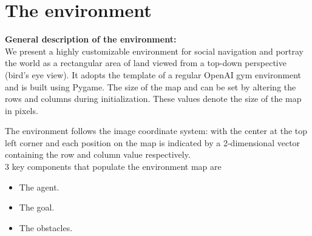 \section{The environment}

\textbf{General description of the environment:}\\

We present a highly customizable environment for social navigation and portray the world as a rectangular area of land viewed from a top-down perspective (bird's eye view). It adopts the template of a regular OpenAI gym environment and is built using Pygame.
The size of the map and can be set by altering the rows and columns during initialization. These values denote the size of the map in pixels.

The environment follows the image coordinate system: with the center at the top left corner and each position on the map is indicated by a 2-dimensional vector containing the row and column value respectively.\\

3 key components that populate the environment map are 
\begin{itemize}
	\item The agent.
	\item The goal.
	\item The obstacles.
\end{itemize}
